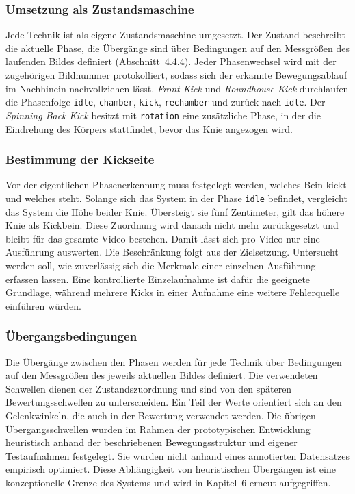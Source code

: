 \documentclass[intern]{cgMA}
\begin{document}
\subsubsection{Umsetzung als Zustandsmaschine}
Jede Technik ist als eigene Zustandsmaschine umgesetzt. Der Zustand beschreibt die aktuelle Phase, die Übergänge sind über Bedingungen auf den Messgrößen des laufenden Bildes definiert (Abschnitt~4.4.4). Jeder Phasenwechsel wird mit der zugehörigen Bildnummer protokolliert, sodass sich der erkannte Bewegungsablauf im Nachhinein nachvollziehen lässt.
\textit{Front Kick} und \textit{Roundhouse Kick} durchlaufen die Phasenfolge \texttt{idle}, \texttt{chamber}, \texttt{kick}, \texttt{rechamber} und zurück nach \texttt{idle}. Der \textit{Spinning Back Kick} besitzt mit \texttt{rotation} eine zusätzliche Phase, in der die Eindrehung des Körpers stattfindet, bevor das Knie angezogen wird.
\subsubsection{Bestimmung der Kickseite}
Vor der eigentlichen Phasenerkennung muss festgelegt werden, welches Bein kickt und welches steht. Solange sich das System in der Phase \texttt{idle} befindet, vergleicht das System die Höhe beider Knie. Übersteigt sie fünf Zentimeter, gilt das höhere Knie als Kickbein. Diese Zuordnung wird danach nicht mehr zurückgesetzt und bleibt für das gesamte Video bestehen.
Damit lässt sich pro Video nur eine Ausführung auswerten. Die Beschränkung folgt aus der Zielsetzung. Untersucht werden soll, wie zuverlässig sich die Merkmale einer einzelnen Ausführung erfassen lassen. Eine kontrollierte Einzelaufnahme ist dafür die geeignete Grundlage, während mehrere Kicks in einer Aufnahme eine weitere Fehlerquelle einführen würden. 
\subsubsection{Übergangsbedingungen}
Die Übergänge zwischen den Phasen werden für jede Technik über Bedingungen auf den Messgrößen des jeweils aktuellen Bildes definiert. Die verwendeten Schwellen dienen der Zustandszuordnung und sind von den späteren Bewertungsschwellen zu unterscheiden. Ein Teil der Werte orientiert sich an den Gelenkwinkeln, die auch in der Bewertung verwendet werden. Die übrigen Übergangsschwellen wurden im Rahmen der prototypischen Entwicklung heuristisch anhand der beschriebenen Bewegungsstruktur und eigener Testaufnahmen festgelegt. Sie wurden nicht anhand eines annotierten Datensatzes empirisch optimiert. Diese Abhängigkeit von heuristischen Übergängen ist eine konzeptionelle Grenze des Systems und wird in Kapitel~6 erneut aufgegriffen.
\end{document}
